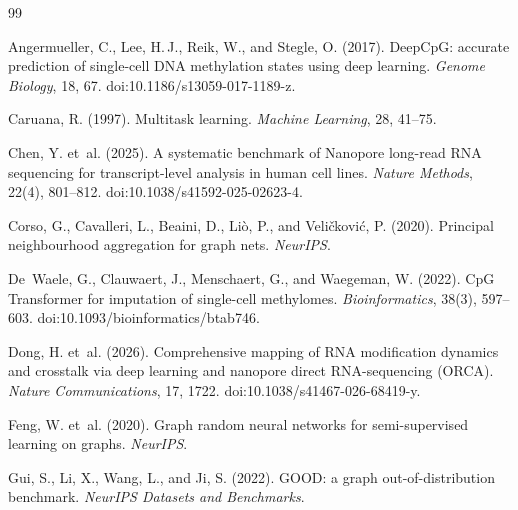 \documentclass[11pt,a4paper]{article}
\begin{document}
{}
\begin{thebibliography}{99}
    \normalsize
    \raggedright    %

    Angermueller, C., Lee, H.\,J., Reik, W., and Stegle, O. (2017).
    \newblock DeepCpG: accurate prediction of single-cell DNA methylation states using deep learning.
    \newblock \textit{Genome Biology}, 18, 67. doi:10.1186/s13059-017-1189-z.

    Caruana, R. (1997).
    \newblock Multitask learning.
    \newblock \textit{Machine Learning}, 28, 41--75.

    Chen, Y. et~al. (2025).
    \newblock A systematic benchmark of Nanopore long-read RNA sequencing for transcript-level analysis in human cell lines.
    \newblock \textit{Nature Methods}, 22(4), 801--812. doi:10.1038/s41592-025-02623-4.

    Corso, G., Cavalleri, L., Beaini, D., Li\`o, P., and Veli\v{c}kovi\'c, P. (2020).
    \newblock Principal neighbourhood aggregation for graph nets.
    \newblock \textit{NeurIPS}.

    De~Waele, G., Clauwaert, J., Menschaert, G., and Waegeman, W. (2022).
    \newblock CpG Transformer for imputation of single-cell methylomes.
    \newblock \textit{Bioinformatics}, 38(3), 597--603. doi:10.1093/bioinformatics/btab746.

    Dong, H. et~al. (2026).
    \newblock Comprehensive mapping of RNA modification dynamics and crosstalk via deep learning and nanopore direct RNA-sequencing (ORCA).
    \newblock \textit{Nature Communications}, 17, 1722. doi:10.1038/s41467-026-68419-y.

    Feng, W. et~al. (2020).
    \newblock Graph random neural networks for semi-supervised learning on graphs.
    \newblock \textit{NeurIPS}.

    Gui, S., Li, X., Wang, L., and Ji, S. (2022).
    \newblock GOOD: a graph out-of-distribution benchmark.
    \newblock \textit{NeurIPS Datasets and Benchmarks}.


\end{thebibliography}
\end{document}
